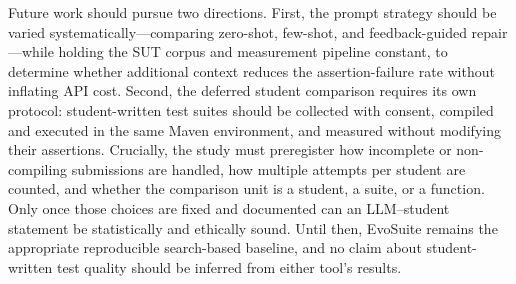 ﻿\documentclass[conference]{IEEEtran}
\begin{document}
Future work should pursue two directions. First, the prompt strategy should be varied systematically---comparing zero-shot, few-shot, and feedback-guided repair---while holding the SUT corpus and measurement pipeline constant, to determine whether additional context reduces the assertion-failure rate without inflating API cost. Second, the deferred student comparison requires its own protocol: student-written test suites should be collected with consent, compiled and executed in the same Maven environment, and measured without modifying their assertions. Crucially, the study must preregister how incomplete or non-compiling submissions are handled, how multiple attempts per student are counted, and whether the comparison unit is a student, a suite, or a function. Only once those choices are fixed and documented can an LLM--student statement be statistically and ethically sound. Until then, EvoSuite remains the appropriate reproducible search-based baseline, and no claim about student-written test quality should be inferred from either tool's results.


\
\
\end{document}
